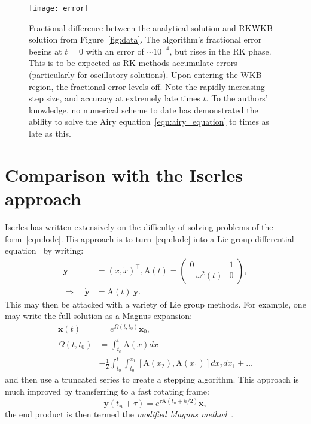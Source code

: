 \begin{figure}[]
  \centering
  \texttt{[image: error]}
  \caption{Fractional difference between the analytical solution and RKWKB solution from Figure~\protect\ref{fig:data}. The algorithm's fractional error begins at $t=0$ with an error of $\sim10^{-4}$, but rises in the RK phase. This is to be expected as RK methods accumulate errors (particularly for oscillatory solutions). Upon entering the WKB region, the fractional error levels off. Note the rapidly increasing step size, and accuracy at extremely late times $t$. To the authors' knowledge, no numerical scheme to date has demonstrated the ability to solve the Airy equation~\protect\eqref{eqn:airy_equation} to times as late as this.\label{fig:error}}
\end{figure}




\section{Comparison with the Iserles approach}
\label{sec:iserles_comparison}
Iserles has written extensively on the difficulty of solving problems of the form~\eqref{eqn:lode}. His approach is to turn~\eqref{eqn:lode} into a Lie-group differential equation~\citep{Iserles00lie-groupmethods} by writing:
\begin{align}
  \mathbf{y} &= (x,\dot{x})^\top, 
  \mathrm{A}(t) = 
  \left(
  \begin{array}{cc}
    0 & 1 \\
    -\omega^2(t) & 0
  \end{array}
  \right),
  \nonumber\\
  \Rightarrow\quad 
  \dot{\mathbf{y}} &= \mathrm{A}(t) \: \mathbf{y}.
  \label{eqn:lie_eqn}
\end{align}
This may then be attacked with a variety of Lie group methods. For example, one may write the full solution as a Magnus expansion:
\begin{align}
  \mathbf{x}(t) &= e^{\Omega(t,t_0)} \mathbf{x}_0,
  \label{eqn:magnus}\\
  \Omega(t,t_0) &= \int_{t_0}^t \mathrm{A}(x) dx \nonumber \\
  &- \frac{1}{2}\int_{t_0}^t\int_{t_0}^{x_1} \left[\mathrm{A}(x_2),\mathrm{A}(x_1)\right] dx_2 dx_1 + \ldots
  \nonumber
\end{align}
and then use a truncated series to create a stepping algorithm.
This approach is much improved by transferring to a fast rotating frame:
\begin{equation}
  \mathbf{y}(t_n+\tau) = e^{\tau \mathrm{A}(t_n+h/2)} \mathbf{x},
  \label{eqn:rotating_frame}
\end{equation}
the end product is then termed the {\em modified Magnus method}~\citep{Iserles01thinkglobally}.

